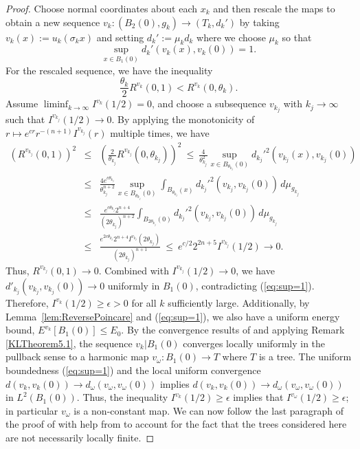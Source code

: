 \documentclass[12pt]{amsart}
\theoremstyle{definition}
\numberwithin{equation}{section}
\begin{document}
\begin{proof}
Choose normal coordinates about each $x_k$ and then rescale the maps to obtain a new sequence $v_k:(B_2(0),g_k)\to (T_k,d_k')$ by taking $v_k(x):= u_k(\sigma_k x)$ and setting $d_k' := \mu_k d_k$ where we choose $\mu_k$ so that 
\begin{equation} \label{eq:sup=1}
\sup_{x \in B_1(0)}d_k'(v_k(x),v_k(0))=1.
\end{equation}
  For the rescaled sequence, we have the inequality
\begin{equation}\label{eq:badineqessreg}
\frac{\theta_k}2R^{v_k}(0,1) <R^{v_k}(0,\theta_k).
\end{equation}
Assume $\liminf_{k \rightarrow \infty} I^{v_k}(1/2) =0$, and choose a subsequence $v_{k_j}$ with $k_j\rightarrow \infty$  such that $I^{v_{k_j}}(1/2) \rightarrow 0$.  By applying the  monotonicity of $r \mapsto e^{cr} r^{-(n+1)}I^{v_{k_j}}(r)$ multiple times,  we have
\begin{eqnarray*}
\left(R^{v_{k_j}}(0,1) \right)^2 & \leq & \left(\frac{2}{\theta_{k_j}}R^{v_{k_j}}(0,\theta_{k_j}) \right)^2 \ \leq \ \frac{4}{\theta_{k_j}^2}\sup_{x \in B_{\theta_{k_j}}(0) }d_{k_j}'^2(v_{k_j}(x), v_{k_j}(0)) 
\\
& \leq & \frac{4e^{c\theta_{k_j}}}{\theta_{k_j}^{n+2}} \sup_{x \in B_{\theta_{k_j}}(0) } \int_{B_{\theta_{k_j}}(x)} d_{k_j}'^2(v_{k_j}, v_{k_j}(0)) \, d\mu_{g_{k_j}}
\\ 
& \leq & 
\frac{e^{c \theta_{k_j}}  2^{n+4}}{(2\theta_{k_j})^{n+2}} \int_{B_{2\theta_{k_j}}(0)} d_{k_j}'^2(v_{k_j}, v_{k_j}(0)) \, d\mu_{g_{k_j}}
\\
&  \leq &
\frac{e^{2c \theta_{k_j}} 2^{n+4}I^{v_{k_j}}(2\theta_{k_j})}{(2\theta_{k_j})^{n+1}} 
\ \leq \  e^{c /2} 2^{2n+5}I^{v_{k_j}}(1/2) \rightarrow 0.
\end{eqnarray*}
Thus, $R^{v_{k_j}}(0,1)\rightarrow 0$.  Combined with $I^{v_{k_j}}(1/2) \rightarrow 0$, we have $d'_{k_j}(v_{k_j},v_{k_j}(0)) \rightarrow 0$  uniformly in $B_1(0)$, contradicting (\ref{eq:sup=1}).  
Therefore, $I^{v_k}(1/2)\geq \epsilon>0$ for all $k$ sufficiently large.  Additionally, by Lemma~\ref{lem:ReversePoincare} and (\ref{eq:sup=1}), we also have a uniform energy bound, $E^{v_k}[B_1(0)] \leq E_0$.    By 
the convergence results of \cite[Section 3]{korevaar-schoen2} and applying Remark \ref{KLTheorem5.1}, the sequence $v_k|B_{1}(0)$ converges locally uniformly in the pullback sense to a harmonic map $v_\omega:B_{1}(0) \rightarrow T$ where $T$ is a tree.  The uniform boundedness  (\ref{eq:sup=1}) and the local uniform convergence  $d(v_k, v_k(0)) \rightarrow d_\omega(v_\omega, v_\omega(0))$ implies $d(v_k, v_k(0))\rightarrow d_\omega(v_\omega, v_\omega(0))$ in $L^2(B_{1}(0))$. 
Thus, the inequality $I^{v_k}(1/2) \geq \epsilon$ 
implies that $I^{v_\omega}(1/2)\geq \epsilon$; in particular $v_\omega$ is a non-constant  map.  We can now follow the last paragraph of the proof of \cite[Theorem 5.5]{gromov-schoen}  with help from \cite[Theorem 3.8 and Theorem 3.9]{sun} to account for the fact that the trees considered here are not necessarily locally finite. 
\end{proof}
\end{document}
